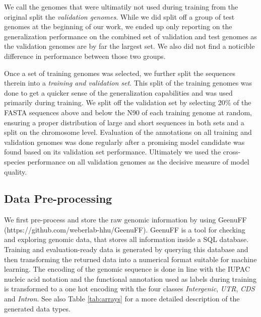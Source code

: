 \documentclass{bioinfo}
\begin{document}
\begin{methods}
We call the genomes that were ultimatily not used during training from the original 
split the {\it validation genomes}. While we did split off a group of test genomes 
at the beginning of our work, we ended up only reporting on the generalization 
performance on the combined set of validation and test genomes as the validation 
genomes are by far the largest set. We also did not find a noticible difference in 
performance between those two groups. 

Once a set of training genomes was selected, we further split the sequences therein into a {\it 
training and validation set}. This split of the training genomes was done to get a 
quicker sense of the generalization capabilities and was used primarily during 
training. We split off the validation set by selecting 20\% of the FASTA sequences 
above and below the N90 of each training genome at random, ensuring a proper distribution of 
large and short sequences in both sets and a split on the chromosome level. 
Evaluation of the annotations on all training and validation genomes was done 
regularly after a promising model candidate was found based on its validation set 
performance. Ultimately we used the cross-species performance on all 
validation genomes as the decisive measure of model quality.

\subsection{Data Pre-processing}
We first pre-process and store the raw genomic information by using GeenuFF 
(https://github.com/weberlab-hhu/GeenuFF). 
GeenuFF is a tool for checking and exploring genomic data, that 
stores all information inside a SQL database. Training and evaluation-ready data is 
generated by querying this database and then transforming the returned data into a 
numerical format suitable for machine learning. The encoding of the genomic sequence 
is done in line with the IUPAC nucleic acid notation and the functional annotation 
used as labels during training is transformed to a one hot encoding with the four 
classes {\it Intergenic}, {\it UTR}, {\it CDS} and {\it Intron}. See also Table 
\ref{tab:arrays} for a more detailed description of the generated data types.


\end{methods}
\end{document}
